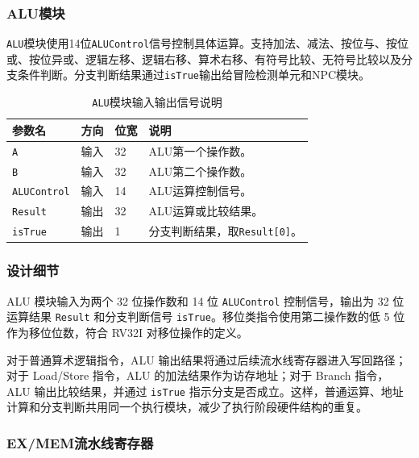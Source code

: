 \documentclass[12pt,a4paper]{ctexart}
\newcommand{\code}[1]{\texttt{#1}}
\begin{document}
\subsubsection{ALU模块}

\code{ALU}模块使用14位\code{ALUControl}信号控制具体运算。支持加法、减法、按位与、按位或、按位异或、逻辑左移、逻辑右移、算术右移、有符号比较、无符号比较以及分支条件判断。分支判断结果通过\code{isTrue}输出给冒险检测单元和NPC模块。

\begin{table}[H]
	\centering
	\caption{\code{ALU}模块输入输出信号说明}
	\footnotesize
	\renewcommand{\arraystretch}{1.15}
	\begin{tabularx}{\textwidth}{p{3.2cm}p{1.5cm}p{2.1cm}X}
		\toprule
		参数名               & 方向 & 位宽 & 说明                        \\
		\midrule
		\code{A}          & 输入 & 32 & ALU第一个操作数。                \\
		\code{B}          & 输入 & 32 & ALU第二个操作数。                \\
		\code{ALUControl} & 输入 & 14 & ALU运算控制信号。                \\
		\code{Result}     & 输出 & 32 & ALU运算或比较结果。               \\
		\code{isTrue}     & 输出 & 1  & 分支判断结果，取\code{Result[0]}。 \\
		\bottomrule
	\end{tabularx}
\end{table}

\subsubsection*{设计细节}

ALU 模块输入为两个 32 位操作数和 14 位 \code{ALUControl} 控制信号，输出为 32 位运算结果 \code{Result} 和分支判断信号 \code{isTrue}。移位类指令使用第二操作数的低 5 位作为移位位数，符合 RV32I 对移位操作的定义。

对于普通算术逻辑指令，ALU 输出结果将通过后续流水线寄存器进入写回路径；对于 Load/Store 指令，ALU 的加法结果作为访存地址；对于 Branch 指令，ALU 输出比较结果，并通过 \code{isTrue} 指示分支是否成立。这样，普通运算、地址计算和分支判断共用同一个执行模块，减少了执行阶段硬件结构的重复。

\subsubsection{EX/MEM流水线寄存器}
\end{document}
